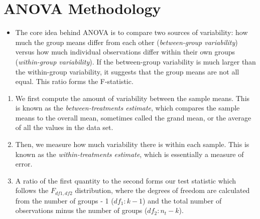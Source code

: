 \documentclass[
  letterpaper,
  DIV=11,
  numbers=noendperiod]{scrreprt}
\providecommand{\tightlist}{%
  \setlength{\itemsep}{0pt}\setlength{\parskip}{0pt}}\usepackage{longtable,booktabs,array}
\begin{document}
\section{ANOVA Methodology}\label{anova-methodology}

\begin{itemize}
\tightlist
\item
  The core idea behind ANOVA is to compare two sources of variability:
  how much the group means differ from each other (\emph{between-group
  variability}) versus how much individual observations differ within
  their own groups (\emph{within-group variability}). If the
  between-group variability is much larger than the within-group
  variability, it suggests that the group means are not all equal. This
  ratio forms the F-statistic.
\end{itemize}

\begin{enumerate}
\def\labelenumi{\arabic{enumi}.}
\tightlist
\item
  We first compute the amount of variability between the sample means.
  This is known as the \emph{between-treatments estimate}, which
  compares the sample means to the overall mean, sometimes called the
  grand mean, or the average of all the values in the data set.
\item
  Then, we measure how much variability there is within each sample.
  This is known as the \emph{within-treatments estimate}, which is
  essentially a measure of error.
\item
  A ratio of the first quantity to the second forms our test statistic
  which follows the \(F_{df1,df2}\) distribution, where the degrees of
  freedom are calculated from the number of groups - 1 (\(df_1: k-1\))
  and the total number of observations minus the number of groups
  (\(df_2: n_t-k\)).
\end{enumerate}
\end{document}
